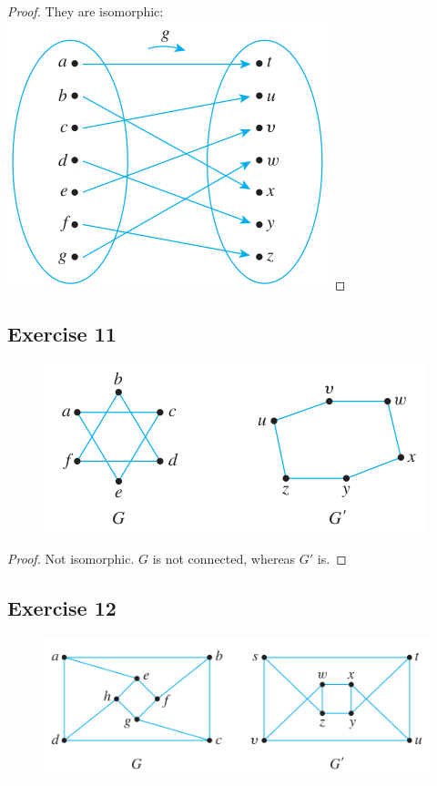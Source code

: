 \documentclass[14pt]{extarticle}
\begin{document}
\begin{proof}
They are isomorphic: 
\includegraphics[scale=0.4]{../images/10.3.10.1.png}
\end{proof}

\subsection{Exercise 11}
\begin{figure}[ht!]
\centering
\includegraphics[scale=0.5]{../images/10.3.11.png}
\end{figure}

\begin{proof}
Not isomorphic. \(G\) is not connected, whereas \(G'\) is.
\end{proof}

\subsection{Exercise 12}
\begin{figure}[ht!]
\centering
\includegraphics[scale=0.5]{../images/10.3.12.png}
\end{figure}
\end{document}
